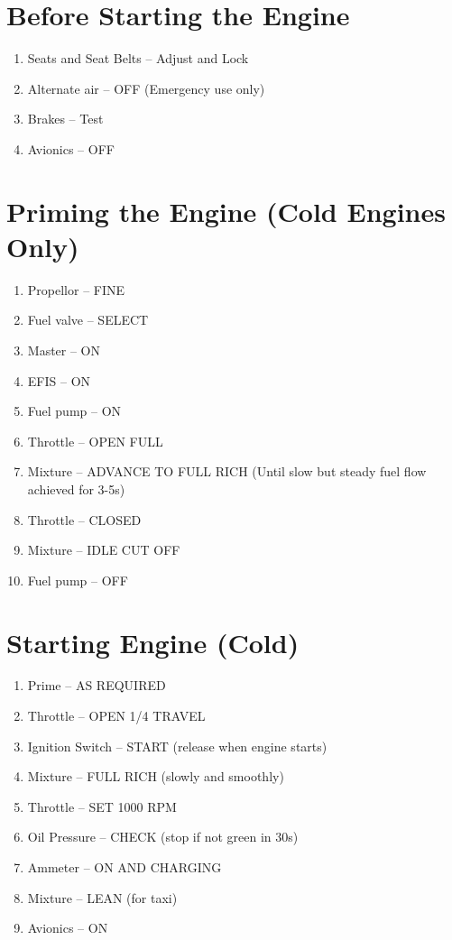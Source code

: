 \section{Before Starting the Engine}
\begin{enumerate}[(1)]
  \item Seats and Seat Belts -- Adjust and Lock
  \item Alternate air -- OFF (Emergency use only)
  \item Brakes -- Test
  \item Avionics -- OFF
\end{enumerate}

\section{Priming the Engine (Cold Engines Only)}
\begin{enumerate}[(1)]
  \item Propellor -- FINE
  \item Fuel valve -- SELECT
  \item Master -- ON
  \item EFIS -- ON
  \item Fuel pump -- ON
  \item Throttle -- OPEN FULL
  \item Mixture -- ADVANCE TO FULL RICH (Until slow but steady fuel flow achieved for 3-5s)
  \item Throttle -- CLOSED
  \item Mixture -- IDLE CUT OFF
  \item Fuel pump -- OFF
\end{enumerate}

\section{Starting Engine (Cold)}
\begin{enumerate}[(1)]
  \item Prime -- AS REQUIRED
  \item Throttle -- OPEN 1/4 TRAVEL
  \item Ignition Switch -- START (release when engine starts)
  \item Mixture -- FULL RICH (slowly and smoothly)
  \item Throttle -- SET 1000 RPM
  \item Oil Pressure -- CHECK (stop if not green in 30s)
  \item Ammeter -- ON AND CHARGING
  \item Mixture -- LEAN (for taxi)
  \item Avionics -- ON 
\end{enumerate}

